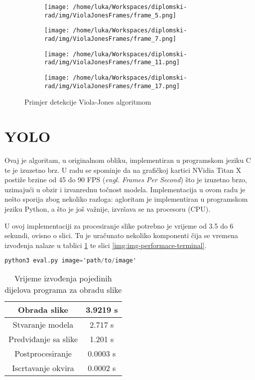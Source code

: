 \begin{figure}[htp]
	\centering
	\begin{subfigure}[b]{0.4\linewidth}
		\texttt{[image: /home/luka/Workspaces/diplomski-rad/img/ViolaJonesFrames/frame\_5.png]}
	\end{subfigure}
	\begin{subfigure}[b]{0.4\linewidth}
		\texttt{[image: /home/luka/Workspaces/diplomski-rad/img/ViolaJonesFrames/frame\_7.png]}
	\end{subfigure}
	\begin{subfigure}[b]{0.4\linewidth}
		\texttt{[image: /home/luka/Workspaces/diplomski-rad/img/ViolaJonesFrames/frame\_11.png]}
	\end{subfigure}
	\begin{subfigure}[b]{0.4\linewidth}
		\texttt{[image: /home/luka/Workspaces/diplomski-rad/img/ViolaJonesFrames/frame\_17.png]}
	\end{subfigure}
	\caption{Primjer detekcije Viola-Jones algoritmom}
	\label{img:violaJones-detection}
\end{figure}

\section{YOLO}

Ovaj je algoritam, u originalnom obliku, implementiran u programskom jeziku C te je izuzetno brz. U radu se spominje da na grafičkoj kartici NVidia Titan X postiže brzine od 45 do 90 FPS (\textit{engl. Frames Per Second}) što je izuzetno brzo, uzimajući u obzir i izvanrednu točnost modela. Implementacija u ovom radu je nešto sporija zbog nekoliko razloga: agloritam je implementiran u programskom jeziku Python, a što je još važnije, izvršava se na procesoru (CPU).

U ovoj implementaciji za procesiranje slike potrebno je vrijeme od 3.5 do 6 sekundi, ovisno o slici. Tu je uračunato nekoliko komponenti čija se vremena izvođenja nalaze u tablici \ref{tab:img-performance} te slici \ref{img:img-performace-terminal}.

\begin{center}
\begin{lstlisting}[language=Awk, caption=Poziv programa za jednu sliku]
python3 eval.py image='path/to/image'
\end{lstlisting}
\end{center}

\begin{table}[h]
\centering
\begin{tabular}{||c|c||}
\hline
\hline
	Obrada slike & 3.9219 s\\
\hline
	Stvaranje modela & 2.717 s\\
\hline
	Predviđanje sa slike & 1.201 s\\
\hline
	Postprocesiranje & 0.0003 s\\
\hline
	Iscrtavanje okvira & 0.0002 s\\
\hline
\hline
\end{tabular}
\caption{Vrijeme izvođenja pojedinih dijelova programa za obradu slike}
\label{tab:img-performance}
\end{table}

